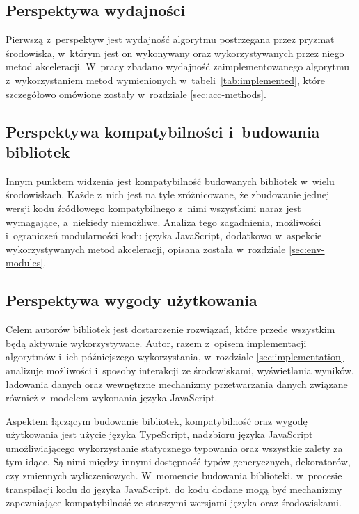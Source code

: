 \subsection{Perspektywa wydajności}

Pierwszą z~perspektyw jest wydajność algorytmu postrzegana przez pryzmat środowiska, w~którym jest on wykonywany oraz wykorzystywanych przez niego metod akceleracji. W~pracy zbadano wydajność zaimplementowanego algorytmu z~wykorzystaniem metod wymienionych w~tabeli~\ref{tab:implemented}, które szczegółowo omówione zostały w~rozdziale \ref{sec:acc-methods}.

\subsection{Perspektywa kompatybilności i~budowania bibliotek}

Innym punktem widzenia jest kompatybilność budowanych bibliotek w~wielu środowiskach. Każde z~nich jest na tyle zróżnicowane, że zbudowanie jednej wersji kodu źródłowego kompatybilnego z~nimi wszystkimi naraz jest wymagające, a~niekiedy niemożliwe. Analiza tego zagadnienia, możliwości i~ograniczeń modularności kodu języka JavaScript, dodatkowo w~aspekcie wykorzystywanych metod akceleracji, opisana została w~rozdziale \ref{sec:env-modules}.

\subsection{Perspektywa wygody użytkowania}

Celem autorów bibliotek jest dostarczenie rozwiązań, które przede wszystkim będą aktywnie wykorzystywane. Autor, razem z~opisem implementacji algorytmów i~ich późniejszego wykorzystania, w~rozdziale \ref{sec:implementation} analizuje możliwości i~sposoby interakcji ze środowiskami, wyświetlania wyników, ładowania danych oraz wewnętrzne mechanizmy przetwarzania danych związane również z~modelem wykonania języka JavaScript.

Aspektem łączącym budowanie bibliotek, kompatybilność oraz wygodę użytkowania jest użycie języka TypeScript, nadzbioru języka JavaScript umożliwiającego wykorzystanie statycznego typowania oraz wszystkie zalety za tym idące. Są nimi między innymi dostępność typów generycznych, dekoratorów, czy zmiennych wyliczeniowych. W~momencie budowania biblioteki, w~procesie transpilacji kodu do języka JavaScript, do kodu dodane mogą być mechanizmy zapewniające kompatybilność ze starszymi wersjami języka oraz środowiskami.

